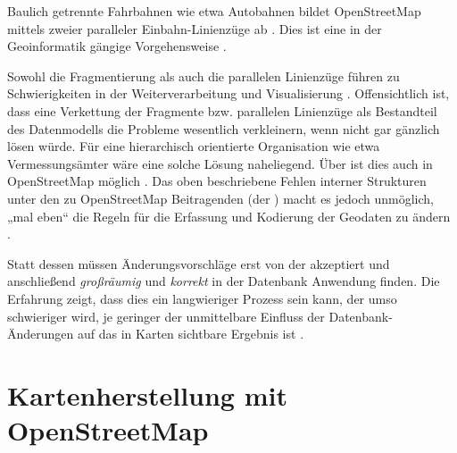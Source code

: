 \documentclass[../main/thesis.tex]{subfiles}
\begin{document}

Baulich getrennte Fahrbahnen wie etwa Autobahnen bildet OpenStreetMap mittels zweier paralleler Einbahn-Linienzüge ab . Dies ist eine in der Geoinformatik gängige Vorgehensweise .

Sowohl die Fragmentierung als auch die parallelen Linienzüge führen zu Schwierigkeiten in der Weiterverarbeitung und Visualisierung \noref[Mig12 u. a.].
Offensichtlich ist, dass eine Verkettung der Fragmente bzw. parallelen Linienzüge als Bestandteil des Datenmodells die Probleme wesentlich verkleinern, wenn nicht gar gänzlich lösen würde. Für eine hierarchisch orientierte Organisation wie etwa Vermessungsämter wäre eine solche Lösung naheliegend. Über  ist dies auch in OpenStreetMap möglich . Das oben beschriebene Fehlen interner Strukturen unter den zu OpenStreetMap Beitragenden (der ) macht es jedoch unmöglich, „mal eben“ die Regeln für die Erfassung und Kodierung der Geodaten zu ändern .


Statt dessen müssen Änderungsvorschläge erst von der  akzeptiert und anschließend \emph{großräumig} und \emph{korrekt} in der Datenbank Anwendung finden. Die Erfahrung zeigt, dass dies ein langwieriger Prozess sein kann, der umso schwieriger wird, je geringer der unmittelbare Einfluss der Datenbank-Änderungen auf das in Karten sichtbare Ergebnis ist \noref.






\section{Kartenherstellung mit OpenStreetMap} \label{kartenherstellung}
\end{document}
